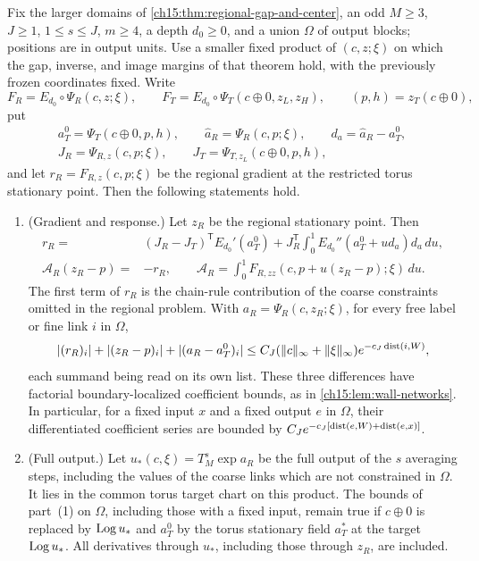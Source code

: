 \begin{theorem}\label{ch16:thm:nonflat-force-comparison}
Fix the larger domains of \cref{ch15:thm:regional-gap-and-center}, an odd $M\ge3$, $J\ge1$, $1\le s\le J$, $m\ge4$, a depth $d_0\ge0$, and a union $\Omega$ of output blocks; positions are in output units. Use a smaller fixed product of $(c,z;\xi)$ on which the gap, inverse, and image margins of that theorem hold, with the previously frozen coordinates fixed. Write
\[
 F_R=E_{d_0}\circ\Psi_R(c,z;\xi),\qquad
 F_T=E_{d_0}\circ\Psi_T(c\oplus0,z_L,z_H),
 \qquad (p,h)=z_T(c\oplus0),
\]
put
\[
 \begin{gathered}
 a_T^0=\Psi_T(c\oplus0,p,h),\qquad
 \widehat a_R=\Psi_R(c,p;\xi),\qquad d_a=\widehat a_R-a_T^0,\\
 J_R=\Psi_{R,z}(c,p;\xi),\qquad
 J_T=\Psi_{T,z_L}(c\oplus0,p,h),
 \end{gathered}
\]
and let $r_R=F_{R,z}(c,p;\xi)$ be the regional gradient at the restricted torus stationary point. Then the following statements hold.
\begin{enumerate}
\item (Gradient and response.) Let $z_R$ be the regional stationary point. Then
\[
 \begin{split}
 r_R={}&(J_R-J_T)^{\mathsf T}E_{d_0}'(a_T^0)
    +J_R^{\mathsf T}\int_0^1
                 E_{d_0}''(a_T^0+u d_a)d_a\,du,\\
 \mathcal A_R(z_R-p)={}&-r_R,\qquad
 \mathcal A_R=\int_0^1F_{R,zz}(c,p+u(z_R-p);\xi)\,du.
 \end{split}
\]
The first term of $r_R$ is the chain-rule contribution of the coarse constraints omitted in the regional problem. With $a_R=\Psi_R(c,z_R;\xi)$, for every free label or fine link $i$ in $\Omega$,
\[
 |(r_R)_i|+|(z_R-p)_i|+|(a_R-a_T^0)_i|
 \le C_J(\|c\|_\infty+\|\xi\|_\infty)e^{-c_J\operatorname{dist}(i,W)},
\]
each summand being read on its own list. These three differences have factorial boundary-localized coefficient bounds, as in \cref{ch15:lem:wall-networks}. In particular, for a fixed input $x$ and a fixed output $e$ in $\Omega$, their differentiated coefficient series are bounded by $C_Je^{-c_J[\operatorname{dist}(e,W)+\operatorname{dist}(e,x)]}$.
\item (Full output.) Let $u_*(c,\xi)=T_M^s\exp a_R$ be the full output of the $s$ averaging steps, including the values of the coarse links which are not constrained in $\Omega$. It lies in the common torus target chart on this product. The bounds of part~(1) on $\Omega$, including those with a fixed input, remain true if $c\oplus0$ is replaced by $\operatorname{Log} u_*$ and $a_T^0$ by the torus stationary field $a_T^*$ at the target $\operatorname{Log} u_*$. All derivatives through $u_*$, including those through $z_R$, are included.

\end{enumerate}
\end{theorem}
